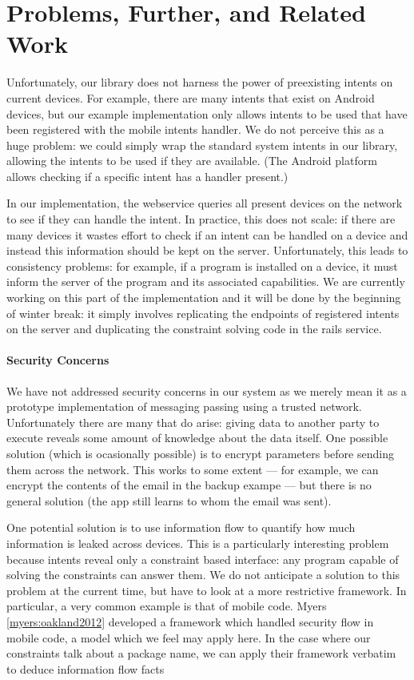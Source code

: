 \documentclass{acm_proc_article-sp}
\begin{document}
\section{Problems, Further, and Related Work}

Unfortunately, our library does not harness the power of preexisting
intents on current devices.  For example, there are many intents that
exist on Android devices, but our example implementation only allows
intents to be used that have been registered with the mobile intents
handler.  We do not perceive this as a huge problem: we could simply
wrap the standard system intents in our library, allowing the intents
to be used if they are available.  (The Android platform allows
checking if a specific intent has a handler present.)

In our implementation, the webservice queries all present devices on
the network to see if they can handle the intent.  In practice, this
does not scale: if there are many devices it wastes effort to check if
an intent can be handled on a device and instead this information
should be kept on the server.  Unfortunately, this leads to
consistency problems: for example, if a program is installed on a
device, it must inform the server of the program and its associated
capabilities.  We are currently working on this part of the
implementation and it will be done by the beginning of winter break:
it simply involves replicating the endpoints of registered intents on
the server and duplicating the constraint solving code in the rails
service.

\paragraph{Security Concerns}

We have not addressed security concerns in our system as we merely
mean it as a prototype implementation of messaging passing using a
trusted network.  Unfortunately there are many that do arise: giving
data to another party to execute reveals some amount of knowledge
about the data itself.  One possible solution (which is ocasionally
possible) is to encrypt parameters before sending them across the
network.  This works to some extent --- for example, we can encrypt
the contents of the email in the backup exampe --- but there is no
general solution (the app still learns to whom the email was sent).

One potential solution is to use information flow to quantify how much
information is leaked across devices.  This is a particularly
interesting problem because intents reveal only a constraint based
interface: any program capable of solving the constraints can answer
them.  We do not anticipate a solution to this problem at the current
time, but have to look at a more restrictive framework.  In
particular, a very common example is that of mobile code.  Myers
\ref{myers:oakland2012} developed a framework which handled security
flow in mobile code, a model which we feel may apply here.  In the
case where our constraints talk about a package name, we can apply
their framework verbatim to deduce information flow facts
\end{document}
